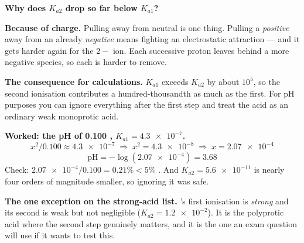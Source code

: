 \documentclass{apchem-worksheet}
\begin{document}
\begin{workedexample}
\textbf{Why does $K_{a2}$ drop so far below $K_{a1}$?}

\textbf{Because of charge.} Pulling  away from neutral
 is one thing. Pulling a \emph{positive}  away from an
already \emph{negative}  means fighting an electrostatic
attraction --- and it gets harder again for the $2-$ ion. Each
successive proton leaves behind a more negative species, so each is
harder to remove.

\textbf{The consequence for calculations.} $K_{a1}$ exceeds $K_{a2}$ by
about $10^{5}$, so the second ionisation contributes a hundred-thousandth
as much  as the first. For pH purposes you can ignore everything
after the first step and treat the acid as an ordinary weak monoprotic
acid.

\textbf{Worked: the pH of \SI{0.100}{\Molar} ,
$K_{a1} = \num{4.3e-7}$.}
\[ x^{2}/0.100 \approx \num{4.3e-7}
   \;\Longrightarrow\;
   x^{2} = \num{4.3e-8}
   \;\Longrightarrow\;
   x = \num{2.07e-4} \]
\[ \text{pH} = -\log(\num{2.07e-4}) = \mathbf{3.68} \]
Check: $\num{2.07e-4}/0.100 = 0.21\% < 5\%$ \checkmark. And
$K_{a2} = \num{5.6e-11}$ is nearly four orders of magnitude smaller, so
ignoring it was safe.

\textbf{The one exception on the strong-acid list.} 's first
ionisation is \emph{strong} and its second is weak but not negligible
($K_{a2} = \num{1.2e-2}$). It is the polyprotic acid where the second
step genuinely matters, and it is the one an exam question will use if
it wants to test this.
\end{workedexample}
\end{document}
